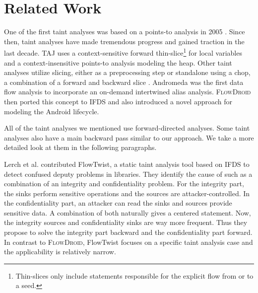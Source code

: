 \documentclass[../draft.tex]{subfiles}
\begin{document}
    \chapter{Related Work}
    One of the first taint analyses was based on a points-to analysis in 2005 \cite{Livshits2005}. Since then, taint analyses have made tremendous progress and gained traction in the last decade.
    TAJ\cite{Tripp2009} uses a context-sensitive forward thin-slice\footnote{Thin-slices only include statements responsible for the explicit flow from or to a seed.} for local variables and a context-insensitive points-to analysis modeling the heap.
    Other taint analyses utilize slicing, either as a preprocessing step \cite{} or standalone using a chop, a combination of a forward and backward slice \cite{Titze2015}.
    Andromeda\cite{Tripp2013} was the first data flow analysis to incorporate an on-demand intertwined alias analysis.
    \textsc{FlowDroid}\cite{Arzt2014} then ported this concept to IFDS and also introduced a novel approach for modeling the Android lifecycle.

    All of the taint analyses we mentioned use forward-directed analyses.
    Some taint analyses also have a main backward pass similar to our approach. We take a more detailed look at them in the following paragraphs.

    Lerch et al.\cite{Lerch2014} contributed FlowTwist, a static taint analysis tool based on IFDS to detect confused deputy problems\footnotemark{} in libraries.
    They identify the cause of such as a combination of an integrity and confidentiality problem.
    For the integrity part, the sinks perform sensitive operations and the sources are attacker-controlled.
    In the confidentiality part, an attacker can read the sinks and sources provide sensitive data.
    A combination of both naturally gives a centered statement.
    Now, the integrity sources and confidentiality sinks are way more frequent.
    Thus they propose to solve the integrity part backward and the confidentiality part forward.
    In contrast to \textsc{FlowDroid}, FlowTwist focuses on a specific taint analysis case and the applicability is relatively narrow.
\end{document}
